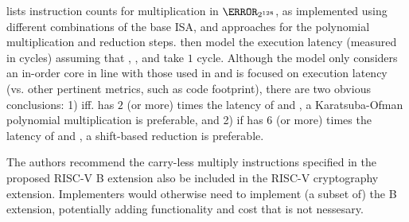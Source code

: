 lists instruction counts for 
multiplication in $\F_{2^{128}}$,
as implemented using different combinations of the base ISA, and approaches
for the polynomial multiplication and reduction steps.
then model the execution latency 
(measured in cycles)
assuming that , , and  take $1$ cycle.
Although the model only considers an in-order core in line with those used
in  and is focused on execution latency
(vs. other pertinent metrics, such as code footprint),
there are two obvious conclusions:
1) iff.
   has $2$ (or more) times the latency of
    and ,
   a 
   Karatsuba-Ofman 
   polynomial multiplication
   is preferable,
   and
2) if
   has $6$ (or more) times the latency of
    and ,
   a shift-based 
   reduction 
   is preferable.

The authors recommend the carry-less multiply instructions
specified in the proposed RISC-V B extension also be included in the
RISC-V cryptography extension.
Implementers would otherwise need to implement (a subset of) the B
extension, potentially adding functionality and cost that is not
nessesary.

